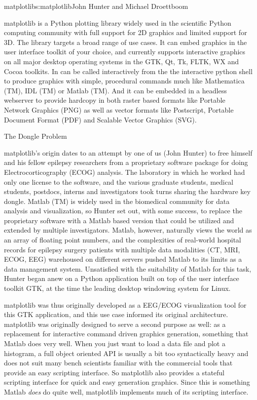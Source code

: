 \begin{aosachapter}{matplotlib}{s:matplotlib}{John Hunter and Michael Droettboom}




matplotlib is a Python plotting library widely used in the scientific
Python computing community with full support for 2D graphics and
limited support for 3D.  The library targets a broad range of use
cases.  It can embed graphics in the user interface toolkit of your
choice, and currently supports interactive graphics on all major
desktop operating systems in the GTK, Qt, Tk, FLTK, WX and Cocoa
toolkits.  In can be called interactively from the the interactive
python shell to produce graphics with simple, procedural commands much
like Mathematica (TM), IDL (TM) or Matlab (TM).  And it can be
embedded in a headless webserver to provide hardcopy in both raster
based formats like Portable Network Graphics (PNG) as well as vector
formats like Postscript, Portable Document Format (PDF) and Scalable
Vector Graphics (SVG).

\begin{aosasect1}{The Dongle Problem}

matplotlib's origin dates to an attempt by one of us (John Hunter) to
free himself and his fellow epilepsy researchers from a proprietary
software package for doing Electrocorticography (ECOG) analysis.  The
laboratory in which he worked had only one license to the software,
and the various graduate students, medical students, postdocs, interns
and investigators took turns sharing the hardware key dongle.  Matlab
(TM) is widely used in the biomedical community for data analysis and
visualization, so Hunter set out, with some success, to replace the
proprietary software with a Matlab based version that could be
utilized and extended by multiple investigators.  Matlab, however,
naturally views the world as an array of floating point numbers, and
the complexities of real-world hospital records for epilepsy surgery
patients with multiple data modalities (CT, MRI, ECOG, EEG) warehoused
on different servers pushed Matlab to its limits as a data management
system.  Unsatisfied with the suitability of Matlab for this task,
Hunter began anew on a Python application built on top of the user
interface toolkit GTK, at the time the leading desktop windowing
system for Linux.

matplotlib was thus originally developed as a EEG/ECOG visualization
tool for this GTK application, and this use case informed its original
architecture.  matplotlib was originally designed to serve a second
purpose as well: as a replacement for interactive command driven
graphics generation, something that Matlab does very well.  When you
just want to load a data file and plot a histogram, a full object
oriented API is usually a bit too syntactically heavy and does not
suit many bench scientists familiar with the commercial tools that
provide an easy scripting interface.  So matplotlib also provides a
stateful scripting interface for quick and easy generation graphics.
Since this is something Matlab \emph{does} do quite well, matplotlib
implements much of its scripting interface.


\end{aosasect1}
\end{aosachapter}
